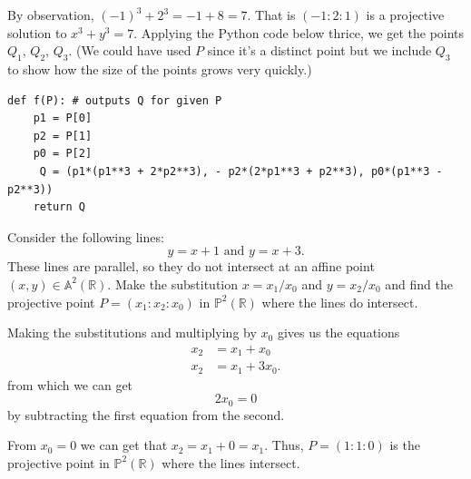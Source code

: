\documentclass[12 pt, letterpaper]{hmcpset}
\begin{document}
\begin{solution}
\begin{enumerate}
			By observation, $(-1)^{3} + 2^{3} = -1 + 8 = 7$. That is $(-1 : 2 : 1)$ is a projective solution to $x^{3} + y^{3} = 7$. Applying the Python code below thrice, we get the points $Q_{1}$, $Q_{2}$, $Q_{3}$. (We could have used $P$ since it's a distinct point but we include $Q_{3}$ to show how the size of the points grows very quickly.)
			\begin{verbatim}
def f(P): # outputs Q for given P
    p1 = P[0]
    p2 = P[1]
    p0 = P[2]
     Q = (p1*(p1**3 + 2*p2**3), - p2*(2*p1**3 + p2**3), p0*(p1**3 - p2**3))
    return Q
			\end{verbatim}
	\end{enumerate}
\end{solution}

\pagebreak

\begin{problem}[3]
	Consider the following lines:
	\[
		y = x + 1 \text{ and } y = x + 3.
	\]
	These lines are parallel, so they do not intersect at an affine point $(x, y) \in \mathbb{A}^{2}(\mathbb{R})$. Make the substitution $x = x_{1}/x_{0}$ and $y = x_{2}/x_{0}$ and find the projective point $P = (x_{1} : x_{2} : x_{0})$ in $\mathbb{P}^{2}(\mathbb{R})$ where the lines do intersect.
\end{problem}

\begin{solution}
	Making the substitutions and multiplying by $x_{0}$ gives us the equations
	\[
		\begin{split}
			x_{2} & = x_{1} + x_{0} \\
			x_{2} & = x_{1} + 3 x_{0}.
		\end{split}
	\]
	from which we can get
	 \[
		2 x_{0} = 0
	\]
	by subtracting the first equation from the second.

	From $x_{0} = 0$ we can get that $x_{2} = x_{1} + 0 = x_{1}$. Thus, $P = (1 : 1 : 0)$ is the projective point in $\mathbb{P}^{2}(\mathbb{R})$ where the lines intersect.
\end{solution}
\end{document}
